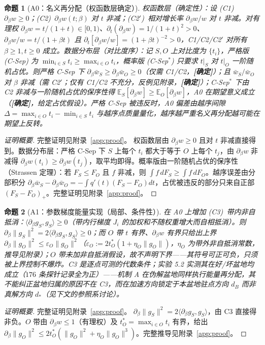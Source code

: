 \documentclass[fontset=windows,11pt]{ctexart}
\newtheorem{proposition}{命题}[section]
\numberwithin{equation}{section}
\begin{document}
\begin{proposition}[A0：名义再分配（权函数层确定）]\label{prop:mechA0}
\emph{权函数层（确定性）}：设 (C1)~$\partial_\beta w\ge0$；(C2)~$\partial_\beta w(t;\beta)$ 对 $t$ 非减；(C2$'$)~相对增长率 $\partial_\beta w/w$ 对 $t$ 非减。对有理权 $\partial_\beta w=t/(1+t)\in[0,1)$、$\partial_t(\partial_\beta w)=1/(1+t)^2>0$、$\partial_\beta w/w=t/(1+\beta t)$ 且 $\partial_t[\partial_\beta w/w]=(1+\beta t)^{-2}>0$，C1/C2/C2$'$ 对所有 $\beta\ge1,t\ge0$ 成立。\emph{数据分布层（对比度序）}：记 $S,O$ 上对比度为 $\{t_i\}$，严格版 (C-Sep) 为 $\min_{i\in S}t_i\ge\max_{i\in O}t_i$，概率版 (C-Sep$^*$) 只要求 $t|_S$ 对 $t|_O$ 一阶随机占优。则严格 C-Sep 下 $\partial_\beta\bar w_S\ge\partial_\beta\bar w_O\ge0$（仅需 C1/C2，\textbf{[确定]}）；且 $\bar w_S/\bar w_O$ 对 $\beta$ 非减（需 C2$'$；仅有 C1/C2 不充分，反例见附录，\textbf{[确定]}）；C-Sep$^*$ 下由 C2 非减与一阶随机占优的保序性\cite{Strassen1965}得 $\mathbb E_S[\partial_\beta w]\ge\mathbb E_O[\partial_\beta w]$，A0 在\emph{期望意义}成立（\textbf{[确定]}，给定占优假设）。严格 C-Sep 被违反时，A0 偏差由越序间隙 $\Delta=\max_{i\in O}t_i-\min_{i\in S}t_i$ 与越序点质量量化，越序越严重名义再分配越可能在期望上反转。
\end{proposition}
\begin{proof}[证明概要]完整证明见附录~\ref{app:proof}。
权函数层由 $\partial_\beta w\ge0$ 且对 $t$ 非减直接得到。数据分布层：严格 C-Sep 下 $S$ 上每个 $t_i$ 都大于等于 $O$ 上每个 $t_j$，由 $\partial_\beta w$ 非减得 $\partial_\beta w(t_i)\ge\partial_\beta w(t_j)$，取平均即得。概率版由一阶随机占优的保序性（Strassen 定理）：若 $F_S\le F_O$ 且 $f$ 非减，则 $\int f\,dF_S\ge\int f\,dF_O$。越序误差由分部积分 $\partial_\beta\bar w_S-\partial_\beta\bar w_O=-\int q'(t)(F_S-F_O)dt$，占优被违反的部分只来自正部 $(F_S-F_O)_+$。完整证明见附录~\ref{app:proof}。
\end{proof}

\begin{proposition}[A1：参数梯度能量实现（局部、条件性）]\label{prop:mechA1}
在 A0 上增加 (C3)~\emph{带内非自抵消}：$\langle\partial_\beta g_S,g_S\rangle\ge0$（带内行梯度 $J_i$ 的加权和不随权重增大而自相抵消）。则 $\partial_\beta\|g_S\|^2=2\langle\partial_\beta g_S,g_S\rangle\ge0$；而 $O$ 带 $t$ 有界、$\partial_\beta w$ 有界只给出上界 $\partial_\beta\|g_O\|^2\le\varepsilon_O\|g_O\|^2$（$\varepsilon_O:=2t_O^*(1+\eta_O\|g_O\|)$，$\eta_O$ 为带外非自抵消常数，推导见附录）；$O$ 带未加非自抵消假设，故不声明下界——其符号可正可负，只须被上界控制不爆炸。C3 是逐点可测的代数条件；实验 5.2 实测其在好/坏盆地均成立（$176$ 条探针记录全为正）——机制 A 在伪解盆地同样执行能量再分配，其不能纠正盆地归属的原因不在 C3，而在加速方向锁定于本盆地驻点方向 $d_B$ 而非真解方向 $d_*$（见下文的参照系讨论）。
\end{proposition}
\begin{proof}[证明概要]完整证明见附录~\ref{app:proof}。
$\partial_\beta\|g_S\|^2=2\langle\partial_\beta g_S,g_S\rangle$，由 C3 直接得非负。$O$ 带由 $\partial_\beta w\le1$（有理权）及 $t_O^*=\max_{i\in O}t_i$ 有界，给出 $\partial_\beta\|g_O\|^2\le2t_O^*(\|g_O\|^2+\eta_O\|g_O\|^3)$。完整推导见附录~\ref{app:proof}。
\end{proof}
\end{document}

